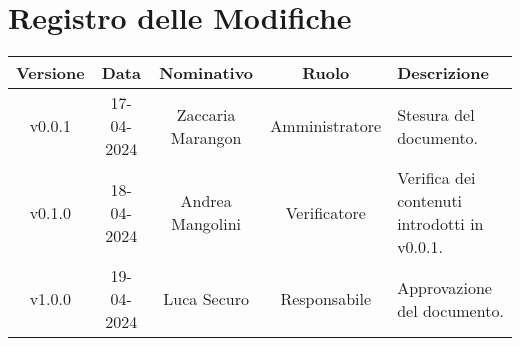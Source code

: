 \section*{\Large Registro delle Modifiche}
    \begin{table}[h]
        \centering
        \renewcommand\tabularxcolumn[1]{m{#1}} %
        \renewcommand{\arraystretch}{1.5}
        \begin{tabularx}{0.98\textwidth}
            {c|c|c|c|>{\centering\arraybackslash}X}
            \rowcolor{black}
            \textbf{\color{white} Versione} & \textbf{\color{white} Data} & \textbf{\color{white} Nominativo} & \textbf{\color{white} Ruolo} & \textbf{\color{white} Descrizione} \\ 
            \hline

            v0.0.1 & 17-04-2024 & Zaccaria Marangon & Amministratore & Stesura del documento.\\
            v0.1.0 & 18-04-2024 & Andrea Mangolini & Verificatore & Verifica dei contenuti introdotti in v0.0.1.\\
            v1.0.0 & 19-04-2024 & Luca Securo & Responsabile & Approvazione del documento.\\
           
            \hline
        \end{tabularx}
    \end{table}